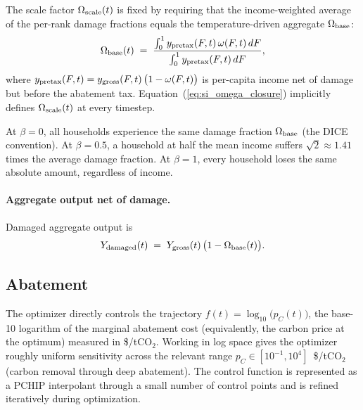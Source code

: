 The scale factor $\Omega_{\rm scale}(t)$ is fixed by requiring that the income-weighted average of the per-rank damage fractions equals the temperature-driven aggregate $\Omega_{\rm base}$:
\begin{equation}\label{eq:si_omega_closure}
\Omega_{\rm base}(t) \;=\; \frac{\int_{0}^{1} y_{\rm pretax}(F, t)\, \omega(F, t)\,dF}{\int_{0}^{1} y_{\rm pretax}(F, t)\,dF}, %
\end{equation}
where $y_{\rm pretax}(F, t) = y_{\rm gross}(F, t)\,\bigl(1 - \omega(F, t)\bigr)$ is per-capita income net of damage but before the abatement tax.  Equation~(\ref{eq:si_omega_closure}) implicitly defines $\Omega_{\rm scale}(t)$ at every timestep.

At $\beta = 0$, all households experience the same damage fraction $\Omega_{\rm base}$ (the DICE convention).  At $\beta = 0.5$, a household at half the mean income suffers $\sqrt{2} \approx 1.41$ times the average damage fraction.  At $\beta = 1$, every household loses the same absolute amount, regardless of income.

\paragraph{Aggregate output net of damage.}  Damaged aggregate output is
\begin{equation}\label{eq:si_ydamaged}
Y_{\rm damaged}(t) \;=\; Y_{\rm gross}(t)\,\bigl(1 - \Omega_{\rm base}(t)\bigr). %
\end{equation}

\subsection*{Abatement}\label{si:abatement}

The optimizer directly controls the trajectory $f(t) = \log_{10}\!\bigl(p_C(t)\bigr)$, the base-10 logarithm of the marginal abatement cost (equivalently, the carbon price at the optimum) measured in \$/tCO$_2$.  Working in log space gives the optimizer roughly uniform sensitivity across the relevant range $p_C \in [10^{-1}, 10^{4}]$~\$/tCO$_2$ (carbon removal through deep abatement).  The control function is represented as a PCHIP interpolant through a small number of control points and is refined iteratively during optimization.

